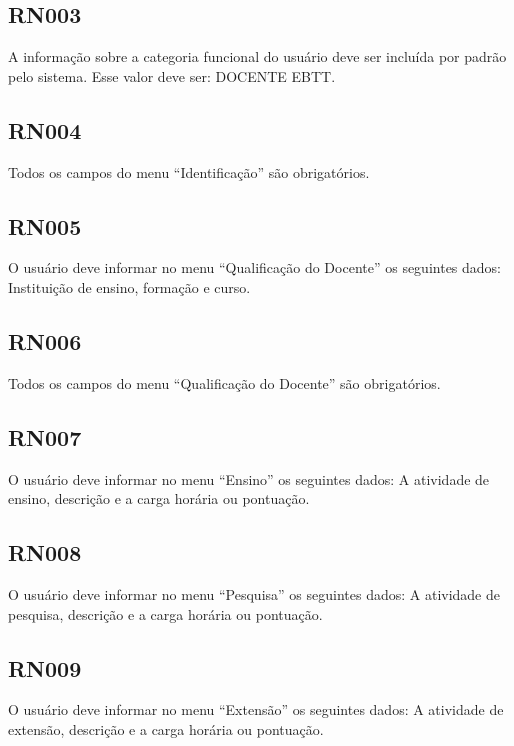 \subsection{RN003}\label{rn003}

A informação sobre a categoria funcional do usuário deve ser incluída por padrão pelo sistema. Esse valor deve ser: DOCENTE EBTT.

\subsection{RN004}\label{rn004}

Todos os campos do menu ``Identificação'' são obrigatórios. 

\subsection{RN005}\label{rn005}

O usuário deve informar no menu ``Qualificação do Docente'' os seguintes dados: Instituição de ensino, formação e curso.

\subsection{RN006}\label{rn006}

Todos os campos do menu ``Qualificação do Docente'' são obrigatórios. 

\subsection{RN007}\label{rn007}

O usuário deve informar no menu ``Ensino'' os seguintes dados: A atividade de ensino, descrição e a carga horária ou pontuação. 

\subsection{RN008}\label{rn008}

O usuário deve informar no menu ``Pesquisa'' os seguintes dados: A atividade de pesquisa, descrição e a carga horária ou pontuação. 

\subsection{RN009}\label{rn009}

O usuário deve informar no menu ``Extensão'' os seguintes dados: A atividade de extensão, descrição e a carga horária ou pontuação.

